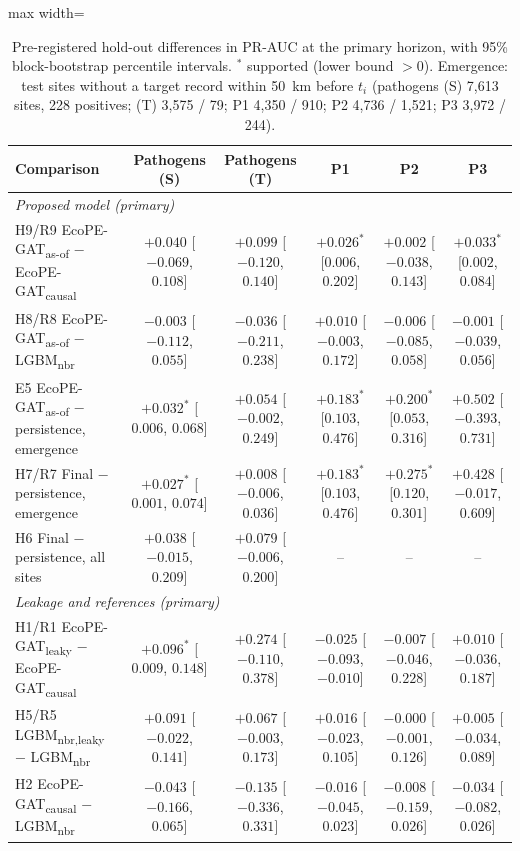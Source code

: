 \documentclass[a4paper,fleqn]{cas-sc}
\newcommand{\Masof}{\mbox{EcoPE-GAT\textsubscript{as-of}}}
\newcommand{\Mcausal}{\mbox{EcoPE-GAT\textsubscript{causal}}}
\newcommand{\Mleaky}{\mbox{EcoPE-GAT\textsubscript{leaky}}}
\newcommand{\Lnbr}{\mbox{LGBM\textsubscript{nbr}}}
\newcommand{\Lleaky}{\mbox{LGBM\textsubscript{nbr,leaky}}}
\begin{document}
\begin{table}[t]
\centering
\caption{Pre-registered hold-out differences in PR-AUC at the primary horizon, with 95\% block-bootstrap percentile intervals. $^\ast$ supported (lower bound $> 0$). Emergence: test sites without a target record within 50~km before $t_i$ (pathogens (S) 7{,}613 sites, 228 positives; (T) 3{,}575 / 79; P1 4{,}350 / 910; P2 4{,}736 / 1{,}521; P3 3{,}972 / 244).}
\label{tab:tests}
\scriptsize
\setlength{\tabcolsep}{3pt}
\begin{adjustbox}{max width=\linewidth}
\begin{tabular}{lccccc}
\toprule
Comparison & Pathogens (S) & Pathogens (T) & P1 & P2 & P3 \\
\midrule
\multicolumn{6}{l}{\textit{Proposed model (primary)}} \\
H9/R9 \Masof{} $-$ \Mcausal & $+0.040$ [$-0.069$, $0.108$] & $+0.099$ [$-0.120$, $0.140$] & $+0.026^\ast$ [$0.006$, $0.202$] & $+0.002$ [$-0.038$, $0.143$] & $+0.033^\ast$ [$0.002$, $0.084$] \\
H8/R8 \Masof{} $-$ \Lnbr & $-0.003$ [$-0.112$, $0.055$] & $-0.036$ [$-0.211$, $0.238$] & $+0.010$ [$-0.003$, $0.172$] & $-0.006$ [$-0.085$, $0.058$] & $-0.001$ [$-0.039$, $0.056$] \\
E5 \Masof{} $-$ persistence, emergence & $+0.032^\ast$ [$0.006$, $0.068$] & $+0.054$ [$-0.002$, $0.249$] & $+0.183^\ast$ [$0.103$, $0.476$] & $+0.200^\ast$ [$0.053$, $0.316$] & $+0.502$ [$-0.393$, $0.731$] \\
H7/R7 Final $-$ persistence, emergence & $+0.027^\ast$ [$0.001$, $0.074$] & $+0.008$ [$-0.006$, $0.036$] & $+0.183^\ast$ [$0.103$, $0.476$] & $+0.275^\ast$ [$0.120$, $0.301$] & $+0.428$ [$-0.017$, $0.609$] \\
H6 Final $-$ persistence, all sites & $+0.038$ [$-0.015$, $0.209$] & $+0.079$ [$-0.006$, $0.200$] & -- & -- & -- \\
\midrule
\multicolumn{6}{l}{\textit{Leakage and references (primary)}} \\
H1/R1 \Mleaky{} $-$ \Mcausal & $+0.096^\ast$ [$0.009$, $0.148$] & $+0.274$ [$-0.110$, $0.378$] & $-0.025$ [$-0.093$, $-0.010$] & $-0.007$ [$-0.046$, $0.228$] & $+0.010$ [$-0.036$, $0.187$] \\
H5/R5 \Lleaky{} $-$ \Lnbr & $+0.091$ [$-0.022$, $0.141$] & $+0.067$ [$-0.003$, $0.173$] & $+0.016$ [$-0.023$, $0.105$] & $-0.000$ [$-0.001$, $0.126$] & $+0.005$ [$-0.034$, $0.089$] \\
H2 \Mcausal{} $-$ \Lnbr & $-0.043$ [$-0.166$, $0.065$] & $-0.135$ [$-0.336$, $0.331$] & $-0.016$ [$-0.045$, $0.023$] & $-0.008$ [$-0.159$, $0.026$] & $-0.034$ [$-0.082$, $0.026$] \\

\end{tabular}
\end{adjustbox}
\end{table}
\end{document}
